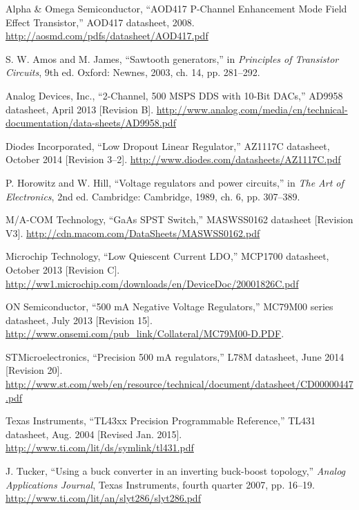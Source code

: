 \renewcommand{\bibsection}{%
    \chapter{\bibname}
    \prebibhook}
\begin{thebibliography}{9}

Alpha \& Omega Semiconductor, ``AOD417 P-Channel Enhancement Mode Field Effect Transistor,''
AOD417 datasheet, 2008. \url{http://aosmd.com/pdfs/datasheet/AOD417.pdf}

S. W. Amos and M. James, ``Sawtooth generators,'' in
\emph{Principles of Transistor Circuits}, 9th ed. Oxford: Newnes, 2003, ch. 14, pp. 281--292.

Analog Devices, Inc., ``2-Channel, 500 MSPS DDS with 10-Bit DACs,'' AD9958 datasheet,
April 2013 [Revision B].
\url{http://www.analog.com/media/cn/technical-documentation/data-sheets/AD9958.pdf}

Diodes Incorporated, ``Low Dropout Linear Regulator,'' AZ1117C datasheet,
October 2014 [Revision 3--2].
\url{http://www.diodes.com/datasheets/AZ1117C.pdf}

P. Horowitz and W. Hill, ``Voltage regulators and power circuits,'' in
\emph{The Art of Electronics}, 2nd ed. Cambridge: Cambridge, 1989, ch. 6, pp. 307--389.

M/A-COM Technology, ``GaAs SPST Switch,'' MASWSS0162 datasheet [Revision V3].
\url{http://cdn.macom.com/DataSheets/MASWSS0162.pdf}

Microchip Technology, ``Low Quiescent Current LDO,'' MCP1700 datasheet,
October 2013 [Revision C].
\url{http://ww1.microchip.com/downloads/en/DeviceDoc/20001826C.pdf}

ON Semiconductor, ``500 mA Negative Voltage Regulators,'' MC79M00 series datasheet,
July 2013 [Revision 15].
\url{http://www.onsemi.com/pub_link/Collateral/MC79M00-D.PDF}.

STMicroelectronics, ``Precision 500 mA regulators,'' L78M datasheet, June 2014 [Revision 20].
\url{http://www.st.com/web/en/resource/technical/document/datasheet/CD00000447.pdf}

Texas Instruments, ``TL43xx Precision Programmable Reference,''
TL431 datasheet, Aug. 2004 [Revised Jan. 2015]. \url{http://www.ti.com/lit/ds/symlink/tl431.pdf}

J. Tucker, ``Using a buck converter in an inverting buck-boost topology,''
\emph{Analog Applications Journal}, Texas Instruments, fourth quarter 2007, pp. 16--19.
\url{http://www.ti.com/lit/an/slyt286/slyt286.pdf}
\end{thebibliography}
